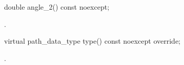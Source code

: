 \begin{itemdecl}
    double angle_2() const noexcept;
\end{itemdecl}
\begin{itemdescr}
	\pnum
	\returns
	.

\end{itemdescr}

\begin{itemdecl}
    virtual path_data_type type() const noexcept override;
\end{itemdecl}
\begin{itemdescr}
	\pnum
	\returns
	.

\end{itemdescr}
